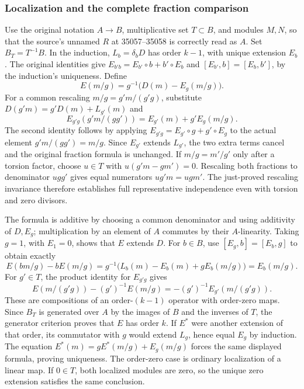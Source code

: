 \subsubsection{Localization and the complete fraction comparison}\label{algebra-proof-043-localization-and-the-complete-fraction-comparison}

Use the original notation \(A\to B\), multiplicative set \(T\subset B\), and modules \(M,N\), so that the source's unnamed \(R\) at 35057--35058 is correctly read as \(A\). Set \(B_T=T^{-1}B\). In the induction, \(L_b=\delta_bD\) has order \(k-1\), with unique extension \(E_b\). The original identities give \(E_{b'b}=E_{b'}\circ b+b'\circ E_b\) and \([E_{b'},b]=[E_b,b']\), by the induction's uniqueness. Define \[
E(m/g)=g^{-1}\bigl(D(m)-E_g(m/g)\bigr).
\] For a common rescaling \(m/g=g'm/(g'g)\), substitute \(D(g'm)=g'D(m)+L_{g'}(m)\) and \[
E_{g'g}(g'm/(gg'))=E_{g'}(m)+g'E_g(m/g).
\] The second identity follows by applying \(E_{g'g}=E_{g'}\circ g+g'\circ E_g\) to the actual element \(g'm/(gg')=m/g\). Since \(E_{g'}\) extends \(L_{g'}\), the two extra terms cancel and the original fraction formula is unchanged. If \(m/g=m'/g'\) only after a torsion factor, choose \(u\in T\) with \(u(g'm-gm')=0\). Rescaling both fractions to denominator \(ugg'\) gives equal numerators \(ug'm=ugm'\). The just-proved rescaling invariance therefore establishes full representative independence even with torsion and zero divisors.

The formula is additive by choosing a common denominator and using additivity of \(D,E_g\); multiplication by an element of \(A\) commutes by their \(A\)-linearity. Taking \(g=1\), with \(E_1=0\), shows that \(E\) extends \(D\). For \(b\in B\), use \([E_g,b]=[E_b,g]\) to obtain exactly \[
E(bm/g)-bE(m/g)
=g^{-1}\bigl(L_b(m)-E_b(m)+gE_b(m/g)\bigr)=E_b(m/g).
\] For \(g'\in T\), the product identity for \(E_{g'g}\) gives \[
E(m/(g'g))-(g')^{-1}E(m/g)=-(g')^{-1}E_{g'}(m/(g'g)).
\] These are compositions of an order-\((k-1)\) operator with order-zero maps. Since \(B_T\) is generated over \(A\) by the images of \(B\) and the inverses of \(T\), the generator criterion proves that \(E\) has order \(k\). If \(E^*\) were another extension of that order, its commutator with \(g\) would extend \(L_g\), hence equal \(E_g\) by induction. The equation \(E^*(m)=gE^*(m/g)+E_g(m/g)\) forces the same displayed formula, proving uniqueness. The order-zero case is ordinary localization of a linear map. If \(0\in T\), both localized modules are zero, so the unique zero extension satisfies the same conclusion.

